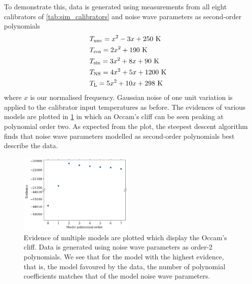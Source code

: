 To demonstrate this, data is generated using measurements from all eight calibrators of \cref{tab:sim_calibrators} and noise wave parameters as second-order polynomials
\begin{align*}
    & T_{\mathrm{unc}} = x^2 -3x + 250 \ \mathrm{K} \\
    & T_{\mathrm{cos}} = 2x^2 + 190 \ \mathrm{K} \\
    & T_{\mathrm{sin}} = 3x^2 + 8x + 90 \ \mathrm{K} \\
    & T_{\mathrm{NS}} = 4x^2 + 5x + 1200 \ \mathrm{K} \\
    & T_{\mathrm{L}} = 5x^2 + 10x + 298 \ \mathrm{K}
\end{align*}
where $x$ is our normalised frequency. Gaussian noise of one unit variation is applied to the calibrator input temperatures as before. The evidences of various models are plotted in \cref{fig:evidence} in which an Occam's cliff can be seen peaking at polynomial order two. As expected from the plot, the steepest descent algorithm finds that noise wave parameters modelled as second-order polynomials best describe the data.

\begin{figure}
    \centering
    \includegraphics[width=0.5\textwidth]{sim_evidence}
    \caption{Evidence of multiple models are plotted which display the Occam's cliff. Data is generated using noise wave parameters as order-2 polynomials. We see that for the model with the highest evidence, that is, the model favoured by the data, the number of polynomial coefficients matches that of the model noise wave parameters.
    \label{fig:evidence}}
\end{figure}


